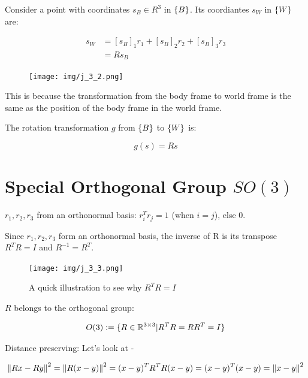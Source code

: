 Consider a point with coordinates $s_B\in R^3$ in $\{B\}$. Its coordiantes $s_W$ in $\{W\}$ are:

\begin{equation*}
    \begin{split}
        s_W &= [s_B]_1r_1 + [s_B]_2r_2 + [s_B]_3r_3 \\
        &= Rs_B
    \end{split}
\end{equation*}

\begin{figure}[h]\centering\texttt{[image: img/j\_3\_2.png]}\end{figure}

 This is because the transformation from the body frame to world frame is the same as the position of the body frame in the world frame.

The rotation transformation $g$ from $\{B\}$ to $\{W\}$ is:

\begin{equation*}
    g(s) = Rs
\end{equation*}

\section{Special Orthogonal Group $SO(3)$}

$r_1, r_2, r_3$ from an orthonormal basis: $r_i^Tr_j = 1$ (when $i=j$), else $0$.

Since $r_1, r_2, r_3$ form an orthonormal basis, the inverse of R is its transpose $R^TR=I$ and $R^{-1} = R^T$.

\begin{figure}[h]\centering\texttt{[image: img/j\_3\_3.png]}\caption{A quick illustration to see why $R^TR=I$}\end{figure}

$R$ belongs to the orthogonal group:

\begin{equation*}
    O(3): = \{ R\in \mathbb{R}^{3\times 3} | R^TR = RR^T = I\}
\end{equation*}

Distance preserving: Let's look at -

\begin{equation*}
    \begin{split}
        \left\lVert Rx - Ry\right\rVert^2 = \left\lVert R(x - y)\right\rVert^2 = (x - y)^TR^TR(x - y) = (x - y)^T(x - y) = \left\lVert x - y\right\rVert^2
    \end{split}
\end{equation*}


